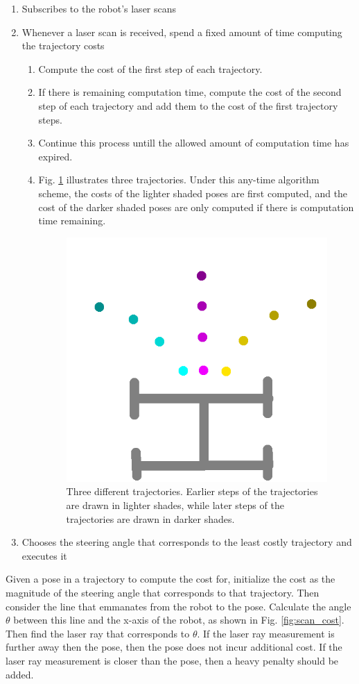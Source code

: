 \documentclass[final]{article}
\begin{document}
\begin{enumerate}
\item Subscribes to the robot's laser scans
\item Whenever a laser scan is received, spend a fixed amount of time computing the trajectory costs
	\begin{enumerate}
	\item Compute the cost of the first step of each trajectory.
	\item If there is remaining computation time, compute the cost of the second step of each trajectory and add them to the cost of the first trajectory steps.
	\item Continue this process untill the allowed amount of computation time has expired.
	\item Fig. \ref{fig:any_time} illustrates three trajectories. Under this any-time algorithm scheme, the costs of the lighter shaded poses are first computed, and the cost of the darker shaded poses are only computed if there is computation time remaining.
	\begin{figure}[h]
	\centering
	\includegraphics[width=0.4\linewidth]{figs/any_time.png}
	\caption{Three different trajectories. Earlier steps of the trajectories are drawn in lighter shades, while later steps of the trajectories are drawn in darker shades.}
	\label{fig:any_time}
	\end{figure}
	\end{enumerate}
	\item Chooses the steering angle that corresponds to the least costly trajectory and executes it
\end{enumerate}

Given a pose in a trajectory to compute the cost for, initialize the cost as the magnitude of the steering angle that corresponds to that trajectory. Then consider the line that emmanates from the robot to the pose. Calculate the angle $\theta$ between this line and the x-axis of the robot, as shown in Fig. \ref{fig:scan_cost}. Then find the laser ray that corresponds to $\theta$. If the laser ray measurement is further away then the pose, then the pose does not incur additional cost. If the laser ray measurement is closer than the pose, then a heavy penalty should be added.
\end{document}
